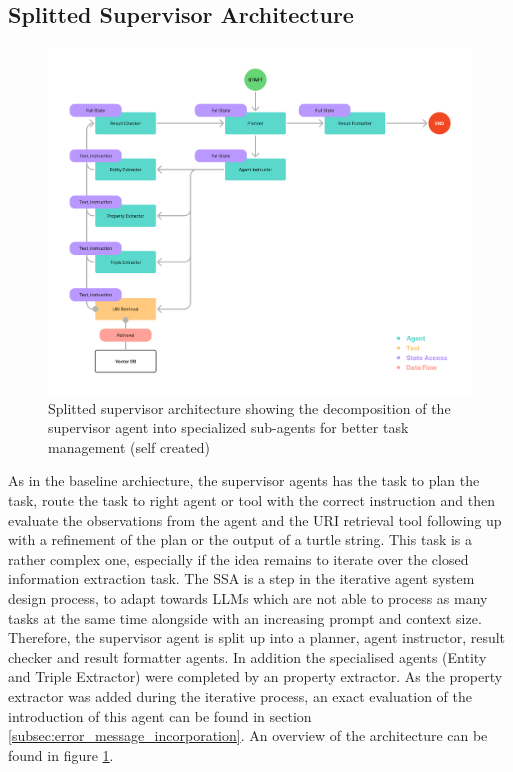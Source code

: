 \documentclass[a4paper,oneside,bibliography=totoc]{scrbook}
\begin{document}
\subsection{Splitted Supervisor Architecture}
\label{subsec:supervisor}

\begin{figure}[h]
  \centering
  \includegraphics[width=\textwidth]{figures/Splitted Supervisor Architecture.png}
  \caption{Splitted supervisor architecture showing the decomposition of the supervisor agent into specialized sub-agents for better task management (self created)}
  \label{fig:splitted_supervisor_architecture}
\end{figure}

As in the baseline archiecture, the supervisor agents has the task to plan the task, route the task to right agent or tool with the correct instruction and then evaluate the observations from the agent and the URI retrieval tool following up with a refinement of the plan or the output of a turtle string. This task is a rather complex one, especially if the idea remains to iterate over the closed information extraction task. The \ac{SSA} is a step in the iterative agent system design process, to adapt towards \acp{LLM} which are not able to process as many tasks at the same time alongside with an increasing prompt and context size. Therefore, the supervisor agent is split up into a planner, agent instructor, result checker and result formatter agents. In addition the specialised agents (Entity and Triple Extractor) were completed by an property extractor. As the property extractor was added during the iterative process, an exact evaluation of the introduction of this agent can be found in section \ref{subsec:error_message_incorporation}. An overview of the architecture can be found in figure \ref{fig:splitted_supervisor_architecture}.
\end{document}
